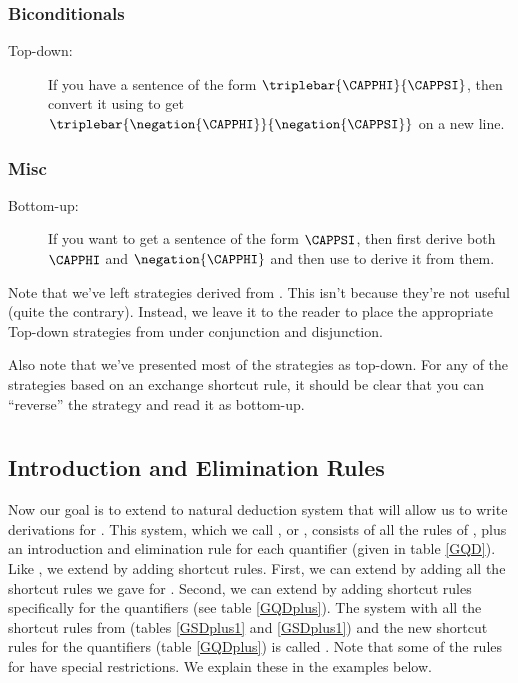 \subsubsection*{Biconditionals} 
\begin{description}
\item[ Top-down:] If you have a sentence of the form $\triplebar{\CAPPHI}{\CAPPSI}$, then convert it using  to get $\triplebar{\negation{\CAPPHI}}{\negation{\CAPPSI}}$ on a new line.
\end{description} 
\subsubsection*{Misc} 
\begin{description}
\item[ Bottom-up:] If you want to get a sentence of the form $\CAPPSI$, then first derive both $\CAPPHI$ and $\negation{\CAPPHI}$ and then use  to derive it from them. 
\end{description} 
\noindent{}Note that we've left strategies derived from . 
This isn't because they're not useful (quite the contrary). 
Instead, we leave it to the reader to place the appropriate Top-down strategies from  under conjunction and disjunction. 

Also note that we've presented most of the strategies as top-down. 
For any of the strategies based on an exchange shortcut rule, it should be clear that you can ``reverse'' the strategy and read it as bottom-up. 

\section{\GQD{}}\label{Section GQD}

\subsection{Introduction and Elimination Rules}

Now our goal is to extend \GSD{} to  natural deduction system that will allow us to write derivations for \GQL{}. 
This system, which we call , or \GQD{}, consists of all the rules of \GSD{}, plus an introduction and elimination rule for each quantifier (given in table \ref{GQD}). 
Like \GSD{}, we extend \GQD{} by adding shortcut rules. 
First, we can extend \GQD{} by adding all the shortcut rules we gave for \GSD{}. 
Second, we can extend \GQD{} by adding shortcut rules specifically for the quantifiers (see table \ref{GQDplus}).
The system with all the shortcut rules from \GSD{} (tables \ref{GSDplus1} and \ref{GSDplus1}) and the new shortcut rules for the quantifiers (table \ref{GQDplus}) is called \GQDP{}.
Note that some of the rules for \GQD{} have special restrictions.
We explain these in the examples below. 

